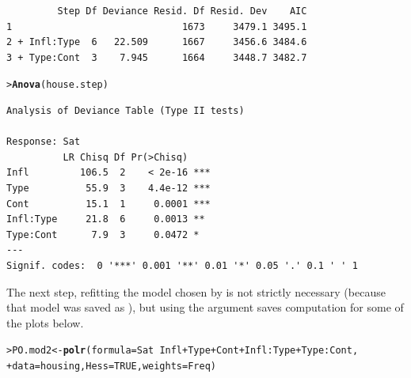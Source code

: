 \documentclass[10pt]{report}\usepackage[]{graphicx}\usepackage[]{color}
\makeatletter
\newcommand{\hlnum}[1]{\textcolor[rgb]{0.686,0.059,0.569}{#1}}%
\newcommand{\hlopt}[1]{\textcolor[rgb]{0,0,0}{#1}}%
\newcommand{\hlstd}[1]{\textcolor[rgb]{0.345,0.345,0.345}{#1}}%
\newcommand{\hlkwb}[1]{\textcolor[rgb]{0.69,0.353,0.396}{#1}}%
\newcommand{\hlkwc}[1]{\textcolor[rgb]{0.333,0.667,0.333}{#1}}%
\newcommand{\hlkwd}[1]{\textcolor[rgb]{0.737,0.353,0.396}{\textbf{#1}}}%
\newenvironment{kframe}{%
 \def\at@end@of@kframe{}%
 \ifinner\ifhmode%
  \def\at@end@of@kframe{\end{minipage}}%
  \begin{minipage}{\columnwidth}%
 \fi\fi%
 \def\FrameCommand##1{\hskip\@totalleftmargin \hskip-\fboxsep
 \colorbox{shadecolor}{##1}\hskip-\fboxsep
     \hskip-\linewidth \hskip-\@totalleftmargin \hskip\columnwidth}%
 \MakeFramed {\advance\hsize-\width
   \@totalleftmargin\z@ \linewidth\hsize
   \@setminipage}}%
 {\par\unskip\endMakeFramed%
 \at@end@of@kframe}
\newenvironment{knitrout}{}{} %
\renewenvironment{knitrout}{\small\renewcommand{\baselinestretch}{.85}}{} %
\makeatother
\begin{document}
\begin{Exercises}
\begin{enumerate*}
\begin{ans}
\begin{knitrout}
\begin{kframe}
\begin{verbatim}
         Step Df Deviance Resid. Df Resid. Dev    AIC
1                              1673     3479.1 3495.1
2 + Infl:Type  6   22.509      1667     3456.6 3484.6
3 + Type:Cont  3    7.945      1664     3448.7 3482.7
\end{verbatim}
\begin{alltt}
\hlstd{> }\hlkwd{Anova}\hlstd{(house.step)}
\end{alltt}
\begin{verbatim}
Analysis of Deviance Table (Type II tests)

Response: Sat
          LR Chisq Df Pr(>Chisq)    
Infl         106.5  2    < 2e-16 ***
Type          55.9  3    4.4e-12 ***
Cont          15.1  1     0.0001 ***
Infl:Type     21.8  6     0.0013 ** 
Type:Cont      7.9  3     0.0472 *  
---
Signif. codes:  0 '***' 0.001 '**' 0.01 '*' 0.05 '.' 0.1 ' ' 1
\end{verbatim}
\end{kframe}
\end{knitrout}
    The next step, refitting the model chosen by  is not strictly
    necessary (because that model was saved as ), but using the argument  saves
    computation for some of the plots below.
\begin{knitrout}\footnotesize
{}\color{fgcolor}\begin{kframe}
\begin{alltt}
\hlstd{> }\hlstd{PO.mod2} \hlkwb{<-} \hlkwd{polr}\hlstd{(}\hlkwc{formula} \hlstd{= Sat} \hlopt{~} \hlstd{Infl} \hlopt{+} \hlstd{Type} \hlopt{+} \hlstd{Cont} \hlopt{+} \hlstd{Infl}\hlopt{:}\hlstd{Type} \hlopt{+} \hlstd{Type}\hlopt{:}\hlstd{Cont,}
\hlstd{+ }                \hlkwc{data} \hlstd{= housing,} \hlkwc{Hess}\hlstd{=}\hlnum{TRUE}\hlstd{,} \hlkwc{weights}\hlstd{=Freq)}
\end{alltt}
\end{kframe}
\end{knitrout}
    
    \end{ans}
    

\end{enumerate*}
\end{Exercises}
\end{document}
